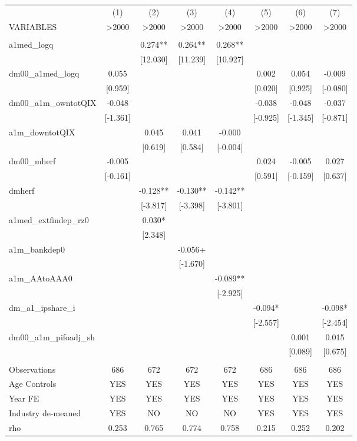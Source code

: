 \documentclass[]{article}
\begin{document}
\begin{tabular}{lccccccc} \hline
 & (1) & (2) & (3) & (4) & (5) & (6) & (7) \\
VARIABLES & >2000 & >2000 & >2000 & >2000 & >2000 & >2000 & >2000 \\ \hline
 &  &  &  &  &  &  &  \\
a1med\_logq &  & 0.274** & 0.264** & 0.268** &  &  &  \\
 &  & [12.030] & [11.239] & [10.927] &  &  &  \\
dm00\_a1med\_logq & 0.055 &  &  &  & 0.002 & 0.054 & -0.009 \\
 & [0.959] &  &  &  & [0.020] & [0.925] & [-0.080] \\
dm00\_a1m\_owntotQIX & -0.048 &  &  &  & -0.038 & -0.048 & -0.037 \\
 & [-1.361] &  &  &  & [-0.925] & [-1.345] & [-0.871] \\
a1m\_downtotQIX &  & 0.045 & 0.041 & -0.000 &  &  &  \\
 &  & [0.619] & [0.584] & [-0.004] &  &  &  \\
dm00\_mherf & -0.005 &  &  &  & 0.024 & -0.005 & 0.027 \\
 & [-0.161] &  &  &  & [0.591] & [-0.159] & [0.637] \\
dmherf &  & -0.128** & -0.130** & -0.142** &  &  &  \\
 &  & [-3.817] & [-3.398] & [-3.801] &  &  &  \\
a1med\_extfindep\_rz0 &  & 0.030* &  &  &  &  &  \\
 &  & [2.348] &  &  &  &  &  \\
a1m\_bankdep0 &  &  & -0.056+ &  &  &  &  \\
 &  &  & [-1.670] &  &  &  &  \\
a1m\_AAtoAAA0 &  &  &  & -0.089** &  &  &  \\
 &  &  &  & [-2.925] &  &  &  \\
dm\_a1\_ipshare\_i &  &  &  &  & -0.094* &  & -0.098* \\
 &  &  &  &  & [-2.557] &  & [-2.454] \\
dm00\_a1m\_pifoadj\_sh &  &  &  &  &  & 0.001 & 0.015 \\
 &  &  &  &  &  & [0.089] & [0.675] \\
 &  &  &  &  &  &  &  \\
Observations & 686 & 672 & 672 & 672 & 686 & 686 & 686 \\
Age Controls & YES & YES & YES & YES & YES & YES & YES \\
Year FE & YES & YES & YES & YES & YES & YES & YES \\
Industry de-meaned & YES & NO & NO & NO & YES & YES & YES \\
 rho & 0.253 & 0.765 & 0.774 & 0.758 & 0.215 & 0.252 & 0.202 \\ \hline
\end{tabular}
\end{document}
